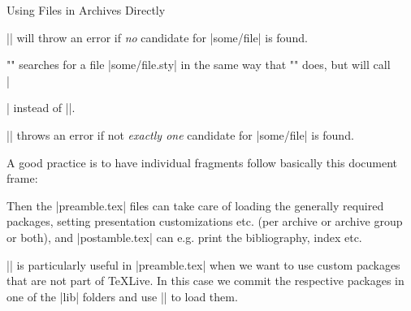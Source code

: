 \begin{sfragment}{Using Files in \sTeX Archives Directly}
\begin{function}{\libinput}
        \stexcode|\libinput| will throw an error if \emph{no} candidate for |some/file|
        is found.
    \end{function}
    \begin{function}{\libusepackage}
      \stexcode"" searches for a file
      |some/file.sty| in the same way that \stexcode"\libinput" does, but will
      call\\
      |\usepackage[package-options]{path/to/some/file}| instead of ||.

      \stexcode|\libusepackage| throws an error if not \emph{exactly one} candidate for
      |some/file| is found.
    \end{function}

    \begin{remark}
        A good practice is to have individual \sTeX fragments
        follow basically this document frame:
        Then the |preamble.tex| files can take care of loading the generally required
        packages, setting presentation customizations etc. (per archive or archive group
        or both), and |postamble.tex| can e.g. print the bibliography, index etc.

        \stexcode|\libusepackage| is particularly useful in |preamble.tex| when we want to
        use custom packages that are not part of {\TeX}Live. In this case we commit the
        respective packages in one of the |lib| folders and use \stexcode|\libusepackage|
        to load them.
    \end{remark}
\end{sfragment}


